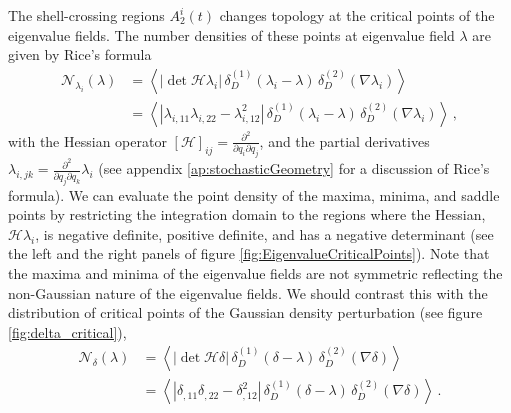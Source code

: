 \documentclass[a4paper, 11pt]{article}
\begin{document}
The shell-crossing regions $A_2^i(t)$ changes topology at the critical points of the eigenvalue fields. The number densities of these points at eigenvalue field $\lambda$ are given by Rice's formula
\begin{align}
\mathcal{N}_{\lambda_i}(\lambda) 
&= \left \langle 
|\det \mathcal{H} \lambda_i |\, \delta_D^{(1)}(\lambda_i - \lambda)\, \delta_D^{(2)}(\nabla \lambda_i)
\right \rangle\nonumber \\
&= \left \langle 
\left|\lambda_{i,11}\lambda_{i,22} -\lambda_{i,12}^2\right|\, 
\delta_D^{(1)}(\lambda_i - \lambda)\, 
\delta_D^{(2)}(\nabla \lambda_i)
\right \rangle \,,
\end{align}
with the Hessian operator $[\mathcal{H}]_{ij}=\frac{\partial^2}{\partial q_i \partial q_j}$, and the partial derivatives $\lambda_{i,jk}=\frac{\partial^2}{\partial q_j \partial q_k} \lambda_i$ (see appendix \ref{ap:stochasticGeometry} for a discussion of Rice's formula). We can evaluate the point density of the maxima, minima, and saddle points by restricting the integration domain to the regions where the Hessian, $\mathcal{H} \lambda_i$, is negative definite, positive definite, and has a negative determinant (see the left and the right panels of figure \ref{fig:EigenvalueCriticalPoints}). Note that the maxima and minima of the eigenvalue fields are not symmetric reflecting the non-Gaussian nature of the eigenvalue fields. We should contrast this with the distribution of critical points of the Gaussian density perturbation (see figure \ref{fig:delta_critical}), 
\begin{align}
\mathcal{N}_{\delta}(\lambda) 
&= \left \langle 
|\det \mathcal{H} \delta |\, \delta_D^{(1)}(\delta - \lambda)\, \delta_D^{(2)}(\nabla \delta)
\right \rangle\nonumber\\
&= \left \langle 
|\delta_{,11}\delta_{,22}-\delta_{,12}^2 |\, \delta_D^{(1)}(\delta - \lambda)\, \delta_D^{(2)}(\nabla \delta)
\right \rangle\,.
\end{align}
\end{document}
